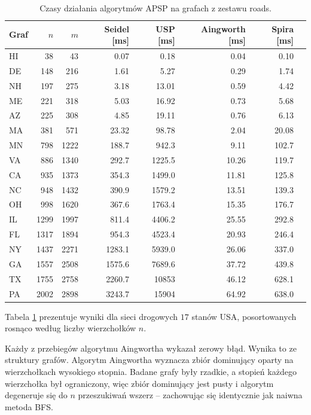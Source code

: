 \begin{table}[H]
\centering
\small
\setlength{\tabcolsep}{5pt}
\renewcommand{\arraystretch}{1.2}
\begin{tabular}{lrrrrrrr}
\toprule
\textbf{Graf} & $n$ & $m$ & Seidel [ms] & USP [ms] & Aingworth [ms] & Spira [ms]  \\
\midrule
HI & 38 & 43 & 0.07 & 0.18 & 0.04 & 0.10 \\
DE & 148 & 216 & 1.61 & 5.27 & 0.29 & 1.74 \\
NH & 197 & 275 & 3.18 & 13.01 & 0.59 & 4.42 \\
ME & 221 & 318 & 5.03 & 16.92 & 0.73 & 5.68 \\
AZ & 225 & 308 & 4.85 & 19.11 & 0.76 & 6.13 \\
MA & 381 & 571 & 23.32 & 98.78 & 2.04 & 20.08\\
MN & 798 & 1222 & 188.7 & 942.3 & 9.11 & 102.7 \\
VA & 886 & 1340 & 292.7 & 1225.5 & 10.26 & 119.7 \\
CA & 935 & 1373 & 354.3 & 1499.0 & 11.81 & 125.8 \\
NC & 948 & 1432 & 390.9 & 1579.2 & 13.51 & 139.3 \\
OH & 998 & 1620 & 367.6 & 1763.4 & 15.35 & 176.7 \\
IL & 1299 & 1997 & 811.4 & 4406.2 & 25.55 & 292.8 \\
FL & 1317 & 1894 & 954.3 & 4523.4 & 20.93 & 246.4 \\
NY & 1437 & 2271 & 1283.1 & 5939.0 & 26.06 & 337.0 \\
GA & 1557 & 2508 & 1575.6 & 7689.6 & 37.72 & 439.8 \\
TX & 1755 & 2758 & 2260.7 & 10853 & 46.12 & 628.1  \\
PA & 2002 & 2898 & 3243.7 & 15904 & 64.92 & 638.0  \\
\bottomrule
\end{tabular}
\caption{Czasy działania algorytmów APSP na grafach z zestawu roads.}
\label{tab:real-roads}
\end{table}

Tabela \ref{tab:real-roads} prezentuje wyniki dla sieci drogowych
$17$ stanów USA, posortowanych rosnąco według liczby wierzchołków $n$.

Każdy z przebiegów algorytmu Aingwortha wykazał zerowy błąd. Wynika to ze struktury grafów.
Algorytm Aingwortha wyznacza zbiór dominujący oparty na wierzchołkach
wysokiego stopnia. Badane grafy były rzadkie, a stopień każdego
wierzchołka był ograniczony,
więc zbiór dominujący jest pusty i algorytm degeneruje się do $n$
przeszukiwań wszerz -- zachowując się identycznie jak naiwna metoda BFS.

